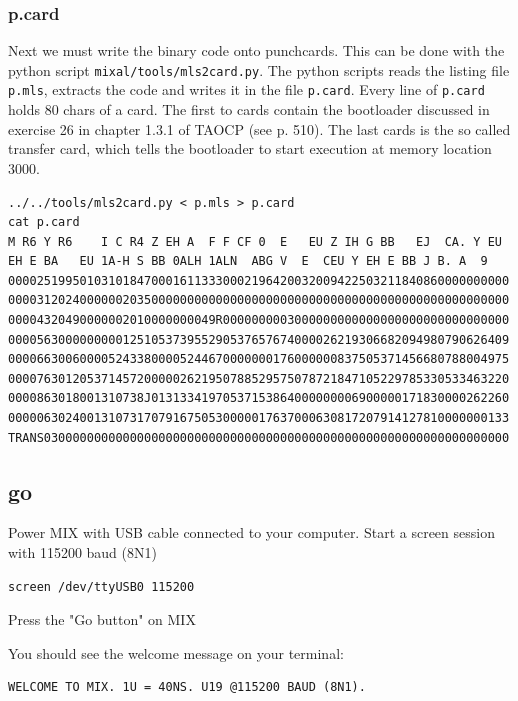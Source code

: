 \documentclass[a4paper,ngerman]{scrartcl}
\begin{document}
\subsubsection{p.card}

Next we must write the binary code onto punchcards. This can be done with the python script \lstinline|mixal/tools/mls2card.py|.
The python scripts reads the listing file \lstinline|p.mls|, extracts the code and writes it in the file \lstinline|p.card|.
Every line of \lstinline|p.card| holds 80 chars of a card. The first to cards contain the bootloader discussed in exercise 26 in chapter 1.3.1 of TAOCP (see p. 510). The last cards is the so called transfer card, which tells the bootloader to start execution at memory location 3000.


\begin{lstlisting}
../../tools/mls2card.py < p.mls > p.card
cat p.card
M R6 Y R6    I C R4 Z EH A  F F CF 0  E   EU Z IH G BB   EJ  CA. Y EU
EH E BA   EU 1A-H S BB 0ALH 1ALN  ABG V  E  CEU Y EH E BB J B. A  9
0000251995010310184700016113330002196420032009422503211840860000000000
0000312024000000203500000000000000000000000000000000000000000000000000
00004320490000002010000000049R0000000003000000000000000000000000000000
0000563000000000125105373955290537657674000026219306682094980790626409
0000663006000052433800005244670000000176000000837505371456680788004975
0000763012053714572000002621950788529575078721847105229785330533463220
0000863018001310738J01313341970537153864000000006900000171830000262260
0000063024001310731707916750530000017637000630817207914127810000000133
TRANS03000000000000000000000000000000000000000000000000000000000000000
\end{lstlisting}

\subsection{go}
Power MIX with USB cable connected to your computer.
Start a screen session with 115200 baud (8N1)
\begin{lstlisting}
screen /dev/ttyUSB0 115200
\end{lstlisting}

Press the "Go button" on MIX

You should see the welcome message on your terminal:
\begin{lstlisting}
WELCOME TO MIX. 1U = 40NS. U19 @115200 BAUD (8N1).                    
\end{lstlisting}
\end{document}
